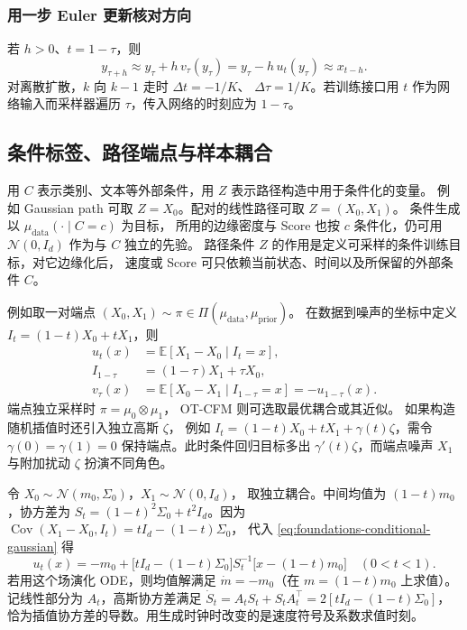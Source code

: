 \subsubsection*{用一步 Euler 更新核对方向}
若 \(h>0\)、\(t=1-\tau\)，则
\[
  y_{\tau+h}\approx y_\tau+h\,v_\tau(y_\tau)
        =y_\tau-h\,u_t(y_\tau)
        \approx x_{t-h}.
\]
对离散扩散，\(k\) 向 \(k-1\) 走时 \(\Delta t=-1/K\)、
\(\Delta\tau=1/K\)。若训练接口用 \(t\) 作为网络输入而采样器遍历
\(\tau\)，传入网络的时刻应为 \(1-\tau\)。

\subsection{条件标签、路径端点与样本耦合}

用 \(C\) 表示类别、文本等外部条件，用 \(Z\) 表示路径构造中用于条件化的变量。
例如 Gaussian path 可取 \(Z=X_0\)。配对的线性路径可取 \(Z=(X_0,X_1)\)。
条件生成以 \(\mu_{\mathrm{data}}(\cdot\mid C=c)\) 为目标，
所用的边缘密度与 Score 也按 \(c\) 条件化，仍可用
\(\mathcal N(0,I_d)\) 作为与 \(C\) 独立的先验。
路径条件 \(Z\) 的作用是定义可采样的条件训练目标，对它边缘化后，
速度或 Score 可只依赖当前状态、时间以及所保留的外部条件 \(C\)。

例如取一对端点 \((X_0,X_1)\sim\pi\in\Pi(\mu_{\mathrm{data}},\mu_{\mathrm{prior}})\)。
在数据到噪声的坐标中定义 \(I_t=(1-t)X_0+tX_1\)，则
\begin{equation}
  \begin{aligned}
    u_t(x)&=\mathbb E[X_1-X_0\mid I_t=x],\\
    I_{1-\tau}&=(1-\tau)X_1+\tau X_0,\\
    v_\tau(x)&=\mathbb E[X_0-X_1\mid I_{1-\tau}=x]=-u_{1-\tau}(x).
  \end{aligned}
  \label{eq:foundations-linear-fm}
\end{equation}
端点独立采样时 \(\pi=\mu_0\otimes\mu_1\)，
OT-CFM 则可选取最优耦合或其近似。
如果构造随机插值时还引入独立高斯 \(\zeta\)，
例如 \(I_t=(1-t)X_0+tX_1+\gamma(t)\zeta\)，需令
\(\gamma(0)=\gamma(1)=0\) 保持端点。此时条件回归目标多出
\(\gamma'(t)\zeta\)，而端点噪声 \(X_1\) 与附加扰动 \(\zeta\)
扮演不同角色。

\begin{example}
令 \(X_0\sim\mathcal N(m_0,\Sigma_0)\)，\(X_1\sim\mathcal N(0,I_d)\)，
取独立耦合。中间均值为 \((1-t)m_0\)，协方差为
\(S_t=(1-t)^2\Sigma_0+t^2I_d\)。因为
\(\operatorname{Cov}(X_1-X_0,I_t)=tI_d-(1-t)\Sigma_0\)，
代入 \eqref{eq:foundations-conditional-gaussian} 得
\[
  u_t(x)=-m_0+\bigl[tI_d-(1-t)\Sigma_0\bigr]S_t^{-1}
             \bigl[x-(1-t)m_0\bigr]
  \quad(0<t<1).
\]
若用这个场演化 ODE，则均值解满足 \(\dot m=-m_0\)（在
\(m=(1-t)m_0\) 上求值）。记线性部分为 \(A_t\)，高斯协方差满足
\(\dot S_t=A_tS_t+S_tA_t^\top=2[tI_d-(1-t)\Sigma_0]\)，
恰为插值协方差的导数。用生成时钟时改变的是速度符号及系数求值时刻。
\end{example}

